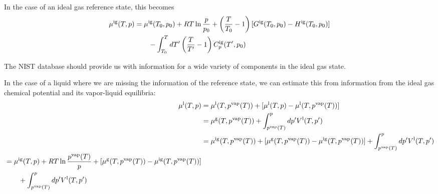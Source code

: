 \documentclass[12pt]{article}
\begin{document}
In the case of an ideal gas reference state, this becomes
\begin{equation}
\begin{split}
\mu^{\rm ig}(T,p) &= \mu^{\rm ig}(T_0,p_0) 
+ RT \ln \frac{p}{p_0}
+ \left(\frac{T}{T_0}-1\right) [G^{\rm ig}(T_0,p_0)-H^{\rm ig}(T_0,p_0)]
\\ & \qquad
- \int_{T_0}^{T} dT' \left(\frac{T}{T'}-1\right) C_p^{\rm ig}(T',p_0)
\end{split}
\end{equation}


The NIST database should provide us with information for a wide
variety of components in the ideal gas state.


In the case of a liquid where we are missing the information of the
reference state, we can estimate this from information from the ideal
gas chemical potential and its vapor-liquid equilibria:
\begin{align}
\mu^{\rm l}(T,p) &= \mu^{\rm l}(T,p^{\rm vap}(T)) 
+ [\mu^{\rm l}(T,p) - \mu^{\rm l}(T,p^{\rm vap}(T))]
\nonumber
\\
&= \mu^{\rm g}(T,p^{\rm vap}(T)) 
+ \int_{p^{\rm vap}(T)}^p dp' V^{\rm l}(T,p')
\nonumber
\\
&= \mu^{\rm ig}(T,p^{\rm vap}(T)) 
+ [\mu^{\rm g}(T,p^{\rm vap}(T))-\mu^{\rm ig}(T,p^{\rm vap}(T))] 
+ \int_{p^{\rm vap}(T)}^p dp' V^{\rm l}(T,p')
\nonumber
\\
\begin{split}
&= \mu^{\rm ig}(T,p) + RT\ln\frac{p^{\rm vap}(T) }{p}
+ [\mu^{\rm g}(T,p^{\rm vap}(T))-\mu^{\rm ig}(T,p^{\rm vap}(T))] 
\\ & \qquad
+ \int_{p^{\rm vap}(T)}^p dp' V^{\rm l}(T,p')
\end{split}
\end{align}








\end{document}
